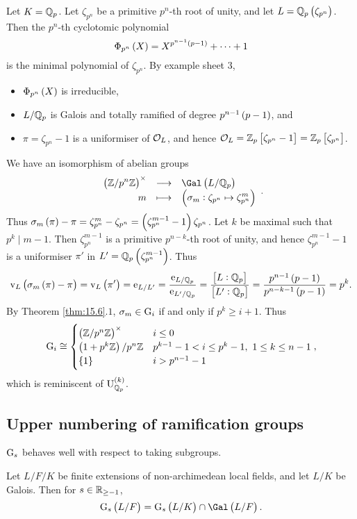 \begin{example*}
Let $ K = \mathbb{Q}_p $. Let $ \zeta_{p^n} $ be a primitive $ p^n $-th root of unity, and let $ L = \QQ_p\br{\zeta_{p^n}} $. Then the $ p^n $-th cyclotomic polynomial
$$ \Phi_{p^n}\br{X} = X^{p^{n - 1}\br{p - 1}} + \dots + 1 $$
is the minimal polynomial of $ \zeta_{p^n} $. By example sheet $ 3 $,
\begin{itemize}
\item $ \Phi_{p^n}\br{X} $ is irreducible,
\item $ L / \mathbb{Q}_p $ is Galois and totally ramified of degree $ p^{n - 1}\br{p - 1} $, and
\item $ \pi = \zeta_{p^n} - 1 $ is a uniformiser of $ \mathcal{O}_L $, and hence $ \OOO_L = \ZZ_p\sbr{\zeta_{p^n} - 1} = \ZZ_p\sbr{\zeta_{p^n}} $.
\end{itemize}
We have an isomorphism of abelian groups
$$ \function{\br{\ZZ / p^n\ZZ}^\times}{\Gal\br{L / \QQ_p}}{m}{\br{\sigma_m : \zeta_{p^n} \mapsto \zeta_{p^n}^m}}. $$
Thus $ \sigma_m\br{\pi} - \pi = \zeta_{p^n}^m - \zeta_{p^n} = \br{\zeta_{p^n}^{m - 1} - 1}\zeta_{p^n} $. Let $ k $ be maximal such that $ p^k \mid m - 1 $. Then $ \zeta_{p^n}^{m - 1} $ is a primitive $ p^{n - k} $-th root of unity, and hence $ \zeta_{p^n}^{m - 1} - 1 $ is a uniformiser $ \pi' $ in $ L' = \QQ_p\br{\zeta_{p^n}^{m - 1}} $. Thus
$$ \v_L\br{\sigma_m\br{\pi} - \pi} = \v_L\br{\pi'} = \e_{L / L'} = \dfrac{\e_{L / \QQ_p}}{\e_{L' / \QQ_p}} = \dfrac{\sbr{L : \QQ_p}}{\sbr{L' : \QQ_p}} = \dfrac{p^{n - 1}\br{p - 1}}{p^{n - k - 1}\br{p - 1}} = p^k. $$
By Theorem \ref{thm:15.6}.$ 1 $, $ \sigma_m \in \mathrm{G}_i $ if and only if $ p^k \ge i + 1 $. Thus
$$ \G_i \cong
\begin{cases}
\br{\ZZ / p^n\ZZ}^\times & i \le 0 \\
\br{1 + p^k\ZZ} / p^n\ZZ & p^{k - 1} - 1 < i \le p^k - 1, \ 1 \le k \le n - 1 \\
\cbr{1} & i > p^{n - 1} - 1
\end{cases},
$$
which is reminiscent of $ \U_{\QQ_p}^{\br{k}} $.
\end{example*}

\subsection{Upper numbering of ramification groups}

$ \mathrm{G}_s $ behaves well with respect to taking subgroups.

\begin{proposition}
\label{prop:16.3}
Let $ L / F / K $ be finite extensions of non-archimedean local fields, and let $ L / K $ be Galois. Then for $ s \in \mathbb{R}_{\ge -1} $,
$$ \G_s\br{L / F} = \G_s\br{L / K} \cap \Gal\br{L / F}. $$
\end{proposition}

